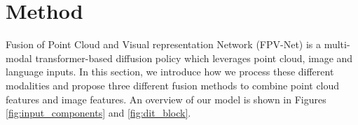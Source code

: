 \section{Method}
\label{sec:model}

Fusion of Point Cloud and Visual representation Network (FPV-Net) is a multi-modal transformer-based diffusion policy which leverages point cloud, image and language inputs. In this section, we introduce how we process these different modalities and propose three different fusion methods to combine point cloud features and image features. An overview of our model is shown in Figures \ref{fig:input_components} and \ref{fig:dit_block}.









